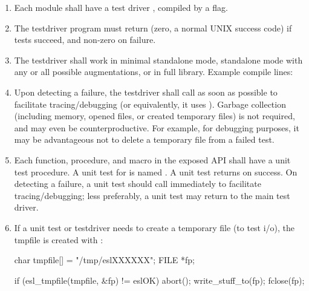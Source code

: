 \begin{enumerate}

\item Each module shall have a test driver , compiled by 
      a  flag.

\item The testdriver program must return  (zero, a normal
      UNIX success code) if tests succeed, and non-zero on failure.

\item The testdriver shall work in minimal standalone mode, 
      standalone mode with any or all possible augmentations, 
      or in full library. Example compile lines:
\begin{cchunk}
\end{cchunk}

\item Upon detecting a failure, the testdriver shall call
       as soon as possible to facilitate
      tracing/debugging (or equivalently, it uses
      ). Garbage collection (including memory, opened
      files, or created temporary files) is not required, and may even
      be counterproductive. For example, for debugging purposes, it
      may be advantageous not to delete a temporary file from a failed
      test.

\item Each function, procedure, and macro in the exposed API shall
      have a unit test procedure. A unit test for
       is named . A unit test returns  on success.  On
      detecting a failure, a unit test should call 
      immediately to facilitate tracing/debugging; less preferably, a
      unit test may return  to the main test driver.

\item If a unit test or testdriver needs to create a temporary file
      (to test i/o), the tmpfile is created with
      :

\begin{cchunk}
          char  tmpfile[] = "/tmp/eslXXXXXX";
          FILE *fp;

          if (esl_tmpfile(tmpfile, &fp) != eslOK) abort();
          write_stuff_to(fp);
          fclose(fp);


\end{cchunk}
\end{enumerate}

